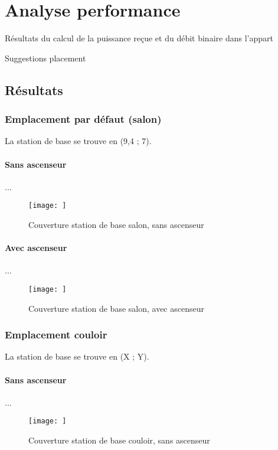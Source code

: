 \chapter{Analyse performance}
\label{chaper-4}

Résultats du calcul de la puissance reçue et du débit binaire dans l'appart

Suggestions placement


\section{Résultats}

\subsection{Emplacement par défaut (salon)}
La station de base se trouve en (9,4 ; 7).

\subsubsection{Sans ascenseur}
...
\begin{figure}[H]
    \centering
    \texttt{[image: ]}
    \caption{Couverture station de base salon, sans ascenseur}
    \label{fig:simu-emplacement-defaut-sansasc}
\end{figure}
\subsubsection{Avec ascenseur}
...
\begin{figure}[H]
    \centering
    \texttt{[image: ]}
    \caption{Couverture station de base salon, avec ascenseur}
    \label{fig:simu-emplacement-defaut-avecasc}
\end{figure}

\subsection{Emplacement couloir}
La station de base se trouve en (X ; Y).

\subsubsection{Sans ascenseur}
...
\begin{figure}[H]
    \centering
    \texttt{[image: ]}
    \caption{Couverture station de base couloir, sans ascenseur}
    \label{fig:simu-emplacement-couloir-sansasc}
\end{figure}
